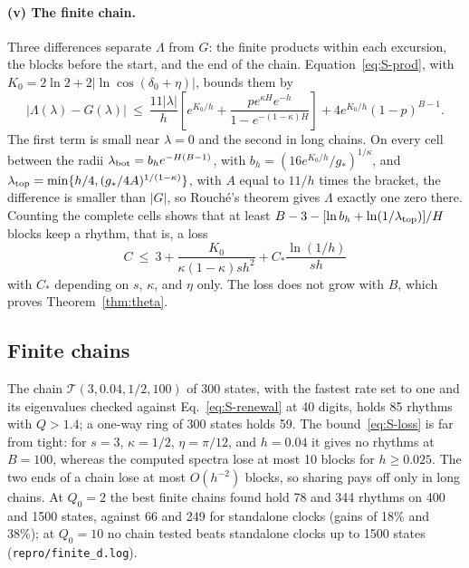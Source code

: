 \paragraph*{(v) The finite chain.} Three differences separate $\Lambda$ from $G$: the finite products within each excursion, the blocks before the start, and the end of the chain. Equation~\eqref{eq:S-prod}, with $K_0=2\ln2+2|\ln\cos(\delta_0+\eta)|$, bounds them by
\begin{equation}
|\Lambda(\lambda)-G(\lambda)|\ \le\ \frac{11|\lambda|}{h}\left[e^{K_0/h}+\frac{pe^{\kappa H}e^{-h}}{1-e^{-(1-\kappa)H}}\right]+4e^{K_0/h}(1-p)^{B-1}.
\label{eq:S-error}
\end{equation}
The first term is small near $\lambda=0$ and the second in long chains. On every cell between the radii $\lambda_{\rm bot}=b_he^{-H(B-1)}$, with $b_h=(16e^{K_0/h}/g_*)^{1/\kappa}$, and $\lambda_{\rm top}=\min\{h/4,(g_*/4A)^{1/(1-\kappa)}\}$, with $A$ equal to $11/h$ times the bracket, the difference is smaller than $|G|$, so Rouch\'e's theorem gives $\Lambda$ exactly one zero there. Counting the complete cells shows that at least $B-3-[\ln b_h+\ln(1/\lambda_{\rm top})]/H$ blocks keep a rhythm, that is, a loss
\begin{equation}
C\ \le\ 3+\frac{K_0}{\kappa(1-\kappa)sh^2}+C_*\frac{\ln(1/h)}{sh}
\label{eq:S-loss}
\end{equation}
with $C_*$ depending on $s$, $\kappa$, and $\eta$ only. The loss does not grow with $B$, which proves Theorem~\ref{thm:theta}.

\subsection{Finite chains}\label{sec:finitechains}

The chain $\mathcal T(3,0.04,1/2,100)$ of 300 states, with the fastest rate set to one and its eigenvalues checked against Eq.~\eqref{eq:S-renewal} at 40 digits, holds 85 rhythms with $Q>1.4$; a one-way ring of 300 states holds 59. The bound~\eqref{eq:S-loss} is far from tight: for $s=3$, $\kappa=1/2$, $\eta=\pi/12$, and $h=0.04$ it gives no rhythms at $B=100$, whereas the computed spectra lose at most 10 blocks for $h\ge0.025$. The two ends of a chain lose at most $O(h^{-2})$ blocks, so sharing pays off only in long chains. At $Q_0=2$ the best finite chains found hold 78 and 344 rhythms on 400 and 1500 states, against 66 and 249 for standalone clocks (gains of 18\% and 38\%); at $Q_0=10$ no chain tested beats standalone clocks up to 1500 states (\texttt{repro/finite\_d.log}).

